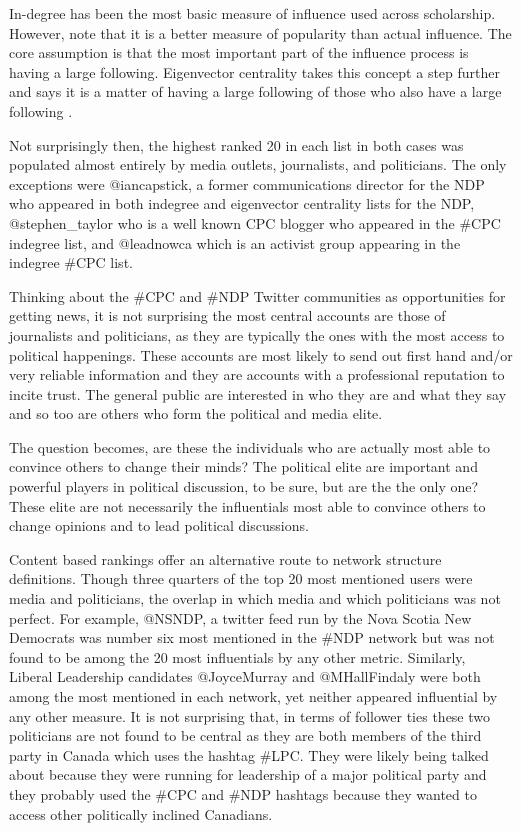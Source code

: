 \documentclass[a4paper,12pt]{article}
\begin{document}
In-degree has been the most basic measure of influence used across scholarship. However, \cite{Cha} note that it is a better measure of popularity than actual influence. The core assumption is that the most important part of the influence process is having a large following. Eigenvector centrality takes this concept a step further and says it is a matter of having a large following of those who also have a large following \cite{ShammaKennedyChurchill2009}.

Not surprisingly then, the highest ranked 20 in each list in both cases was populated almost entirely by media outlets, journalists, and politicians. The only exceptions were @iancapstick, a former communications director for the NDP who appeared in both indegree and eigenvector centrality lists for the NDP, @stephen\_taylor who is a well known CPC blogger who appeared in the \#CPC indegree list, and @leadnowca which is an activist group appearing in the indegree \#CPC list.

Thinking about the \#CPC and \#NDP Twitter communities as opportunities for getting news, it is not surprising the most central accounts are those of journalists and politicians, as they are typically the ones with the most access to political happenings. These accounts are most likely to send out first hand and/or very reliable information and they are accounts with a professional reputation to incite trust. The general public are interested in who they are and what they say and so too are others who form the political and media elite.

The question becomes, are these the individuals who are actually most able to convince others to change their minds? The political elite are important and powerful players in political discussion, to be sure, but are the the only one? These elite are not necessarily the influentials most able to convince others to change opinions and to lead political discussions.

Content based rankings offer an alternative route to network structure definitions. Though three quarters of the top 20 most mentioned users were media and politicians, the overlap in which media and which politicians was not perfect. For example, @NSNDP, a twitter feed run by the Nova Scotia New Democrats was number six most mentioned in the \#NDP network but was not found to be among the 20 most influentials by any other metric. Similarly, Liberal Leadership candidates @JoyceMurray and @MHallFindaly were both among the most mentioned in each network, yet neither appeared influential by any other measure. It is not surprising that, in terms of follower ties these two politicians are not found to be central as they are both members of the third party in Canada which uses the hashtag \#LPC. They were likely being talked about because they were running for leadership of a major political party and they probably used the \#CPC and \#NDP hashtags because they wanted to access other politically inclined Canadians.
\end{document}
